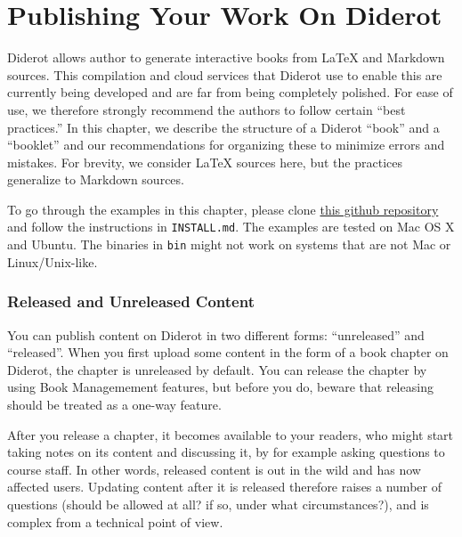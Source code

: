 \chapter{Publishing Your Work On Diderot}
\label{ch:publish}

Diderot allows author to generate interactive books from LaTeX and Markdown sources.
%
This compilation and cloud services that Diderot use to enable this are currently being developed and are far from being completely polished.
%
For ease of use, we therefore strongly recommend the authors to follow certain ``best practices.''
%
In this chapter, we describe the structure of a Diderot ``book'' and a ``booklet'' and our recommendations for organizing these to minimize errors and mistakes.
%
For brevity, we consider LaTeX sources here, but the practices generalize to Markdown sources.
  

\begin{important}[Sources]
To go through the examples in this chapter, please clone 
%
\href{https://github.com/diderot-edu/diderot-guide}{this github repository}
%
and follow the instructions in \lstinline`INSTALL.md`. 
%
The examples are tested on Mac OS X and Ubuntu.  The binaries in \lstinline`bin` might not work on systems that are not Mac or Linux/Unix-like. 
\end{important}

\subsection{Released and Unreleased Content}

You can publish content on Diderot in two different forms: ``unreleased'' and ``released''.
%
When you first upload some content in the form of a book chapter on Diderot, the chapter is unreleased by default.
%
You can release the chapter by using Book Managemement features, but before you  do, beware that releasing should be treated as a one-way feature.
%

After you release a chapter, it becomes available to your readers, who might start taking notes on its content and discussing it, by for example asking questions to course staff.
%
In other words, released content is out in the wild and has now affected users.
%
Updating content after it is released  therefore raises a number of questions (should be allowed at all? if so, under what circumstances?), and is complex from a technical point of view.

